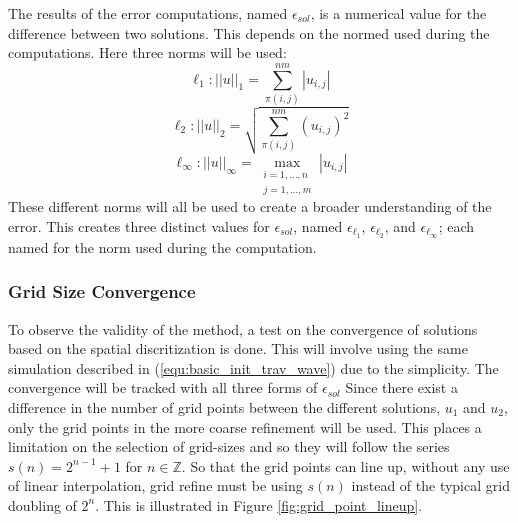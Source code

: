   The results of the error computations, named $\epsilon_{sol}$, is a numerical value for the difference between two solutions.
  This depends on the normed used during the computations.
  Here three norms will be used:
  \begin{equation}  \label{equ:norm_l1}
    \ell_1: ||u||_1 = \sum_{\pi(i,j)}^{nm} |u_{i,j}|
  \end{equation}
  \begin{equation}  \label{equ:norm_l2}
    \ell_2: ||u||_2 = \sqrt{\sum_{\pi(i,j)}^{nm} (u_{i,j})^2}
  \end{equation}
  \begin{equation}  \label{equ:norm_linf}
    \ell_\infty: ||u||_\infty = \max_{\substack{i=1,\ldots,n \\j=1,\ldots,m}} |u_{i,j}|
  \end{equation}
  These different norms will all be used to create a broader understanding of the error.
  This creates three distinct values for $\epsilon_{sol}$, named $\epsilon_{\ell_1}$, $\epsilon_{\ell_2}$, and $\epsilon_{\ell_\infty}$; each named for the norm used during the computation.
  

\subsubsection{Grid Size Convergence}
  To observe the validity of the method, a test on the convergence of solutions based on the spatial discritization is done.
  This will involve using the same simulation described in (\ref{equ:basic_init_trav_wave}) due to the simplicity. 
  The convergence will be tracked with all three forms of $\epsilon_{sol}$
  Since there exist a difference in the number of grid points between the different solutions, $u_1$ and $u_2$, only the grid points in the more coarse refinement will be used.
  This places a limitation on the selection of grid-sizes and so they will follow the series $s(n) = 2^{n-1}+1$ for $n \in \mathbb{Z}$.
  So that the grid points can line up, without any use of linear interpolation, grid refine must be using $s(n)$ instead of the typical grid doubling of $2^{n}$. 
  This is illustrated in Figure \ref{fig:grid_point_lineup}.


